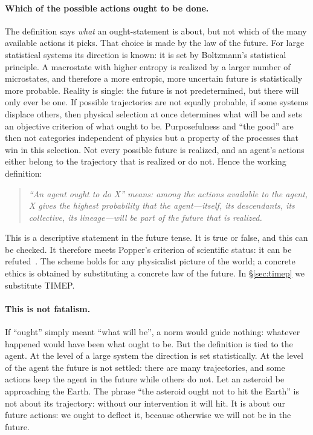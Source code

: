\documentclass[11pt,a4paper]{article}
\newcommand{\Sref}[1]{\hyperref[#1]{\S\ref{#1}}}
\begin{document}
\paragraph{Which of the possible actions ought to be done.}
The definition says \emph{what} an ought-statement is about, but not which of the many available actions it picks. That choice is made by the law of the future. For large statistical systems its direction is known: it is set by Boltzmann's statistical principle. A macrostate with higher entropy is realized by a larger number of microstates, and therefore a more entropic, more uncertain future is statistically more probable. Reality is single: the future is not predetermined, but there will only ever be one. If possible trajectories are not equally probable, if some systems displace others, then physical selection at once determines what will be and sets an objective criterion of what ought to be. Purposefulness and ``the good'' are then not categories independent of physics but a property of the processes that win in this selection. Not every possible future is realized, and an agent's actions either belong to the trajectory that is realized or do not. Hence the working definition:

\begin{quote}
\emph{``An agent ought to do X'' means: among the actions available to the agent, X gives the highest probability that the agent---itself, its descendants, its collective, its lineage---will be part of the future that is realized.}
\end{quote}

This is a descriptive statement in the future tense. It is true or false, and this can be checked. It therefore meets Popper's criterion of scientific status: it can be refuted~\cite{popper1959}. The scheme holds for any physicalist picture of the world; a concrete ethics is obtained by substituting a concrete law of the future. In \Sref{sec:timep} we substitute TIMEP.

\paragraph{This is not fatalism.}
If ``ought'' simply meant ``what will be'', a norm would guide nothing: whatever happened would have been what ought to be. But the definition is tied to the agent. At the level of a large system the direction is set statistically. At the level of the agent the future is not settled: there are many trajectories, and some actions keep the agent in the future while others do not. Let an asteroid be approaching the Earth. The phrase ``the asteroid ought not to hit the Earth'' is not about its trajectory: without our intervention it will hit. It is about our future actions: we ought to deflect it, because otherwise we will not be in the future.
\end{document}
